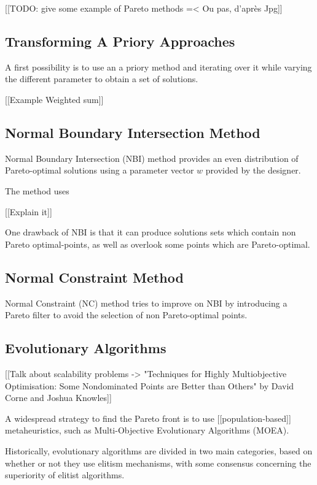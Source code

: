 [[TODO: give some example of Pareto methods =< Ou pas, d'après Jpg]]

\subsection{Transforming A Priory Approaches}

A first possibility is to use an a priory method and iterating over it while varying the different parameter to obtain a set of solutions.

[[Example Weighted sum]]

\subsection{Normal Boundary Intersection Method}

Normal Boundary Intersection (NBI) \cite{S1052623496307510} method provides an even distribution of Pareto-optimal solutions using a parameter vector $w$ provided by the designer.

The method uses

[[Explain it]]

One drawback of NBI is that it can produce solutions sets which contain non Pareto optimal-points, as well as overlook some points which are Pareto-optimal.

\subsection{Normal Constraint Method}

Normal Constraint (NC) method tries to improve on NBI by introducing a Pareto filter to avoid the selection of non Pareto-optimal points.

\subsection{Evolutionary Algorithms}

[[Talk about scalability problems -> "Techniques for Highly Multiobjective Optimisation: Some Nondominated Points are Better than Others" by David Corne and Joshua Knowles]]


A widespread strategy to find the Pareto front is to use [[population-based]] metaheuristics, such as Multi-Objective Evolutionary Algorithms (MOEA). 

Historically, evolutionary algorithms are divided in two main categories, based on whether or not they use elitism mechanisms, with some consensus concerning the superiority of elitist algorithms.

